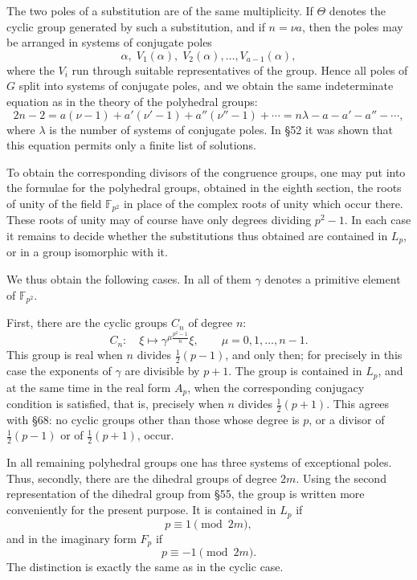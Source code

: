 \documentclass[11pt,a4paper]{book}
\newcommand{\F}{\mathbb F}
\begin{document}
The two poles of a substitution are of the same multiplicity.  If \(\Theta\) denotes the cyclic group generated by such a substitution, and if \(n=\nu a\), then the poles may be arranged in systems of conjugate poles
\[
 \alpha,\;V_1(\alpha),\;V_2(\alpha),\ldots,V_{a-1}(\alpha),
\]
where the \(V_i\) run through suitable representatives of the group.  Hence all poles of \(G\) split into systems of conjugate poles, and we obtain the same indeterminate equation as in the theory of the polyhedral groups:
\[
 2n-2=a(\nu-1)+a'(\nu'-1)+a''(\nu''-1)+\cdots
      =n\lambda-a-a'-a''-\cdots ,
\]
where \(\lambda\) is the number of systems of conjugate poles.  In \S 52 it was shown that this equation permits only a finite list of solutions.

To obtain the corresponding divisors of the congruence groups, one may put into the formulae for the polyhedral groups, obtained in the eighth section, the roots of unity of the field \(\F_{p^2}\) in place of the complex roots of unity which occur there.  These roots of unity may of course have only degrees dividing \(p^2-1\).  In each case it remains to decide whether the substitutions thus obtained are contained in \(L_p\), or in a group isomorphic with it.

We thus obtain the following cases.  In all of them \(\gamma\) denotes a primitive element of \(\F_{p^2}\).

First, there are the cyclic groups \(C_n\) of degree \(n\):
\[
 C_n:\quad
 \xi\longmapsto \gamma^{\mu\frac{p^2-1}{n}}\xi,\qquad
 \mu=0,1,\ldots,n-1 .
\]
This group is real when \(n\) divides \(\frac12(p-1)\), and only then; for precisely in this case the exponents of \(\gamma\) are divisible by \(p+1\).  The group is contained in \(L_p\), and at the same time in the real form \(A_p\), when the corresponding conjugacy condition is satisfied, that is, precisely when \(n\) divides \(\frac12(p+1)\).  This agrees with \S 68: no cyclic groups other than those whose degree is \(p\), or a divisor of \(\frac12(p-1)\) or of \(\frac12(p+1)\), occur.

In all remaining polyhedral groups one has three systems of exceptional poles.  Thus, secondly, there are the dihedral groups of degree \(2m\).  Using the second representation of the dihedral group from \S 55, the group is written more conveniently for the present purpose.  It is contained in \(L_p\) if
\[
 p\equiv 1\pmod {2m},
\]
and in the imaginary form \(F_p\) if
\[
 p\equiv -1\pmod {2m}.
\]
The distinction is exactly the same as in the cyclic case.
\end{document}
